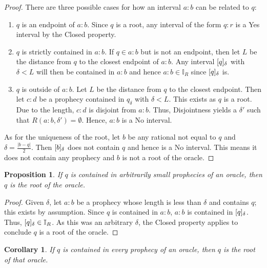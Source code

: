 \documentclass[12pt]{article}
\newtheorem{corollary}{Corollary}[section]
\newtheorem{proposition}{Proposition}[section]
\begin{document}
\begin{proof}
    There are three possible cases for how an interval $a:b$ can be related to $q$:

    \begin{enumerate}
        \item $q$ is an endpoint of $a:b$. Since $q$ is a root, any interval of the form $q:r$ is a Yes interval by the Closed property.
        \item $q$ is strictly contained in $a:b$. If $q \in a:b$ but is not an endpoint, then let $L$ be the distance from $q$ to the closest endpoint of $a:b$. Any interval $[q]_{\delta}$ with $\delta < L $ will then be contained in $a:b$ and hence $a:b \in \mathbb{I}_R$ since $[q]_{\delta}$ is. 
        \item $q$ is outside of $a:b$.  Let $L$ be the distance from $q$ to the closest endpoint. Then let $c:d$ be a prophecy contained in $q_{\delta}$ with $\delta < L$. This exists as $q$ is a root. Due to the length, $c:d$ is disjoint from $a:b$. Thus, Disjointness yields a $\delta'$ such that $R(a:b, \delta')= \emptyset$. Hence, $a:b$ is a No interval. 
    \end{enumerate}
    
    As for the uniqueness of the root, let $b$ be any rational not equal to $q$ and $\delta = \frac{|b-q|}{2}$. Then $[b]_{\delta}$ does not contain $q$ and hence is a No interval. This means it does not contain any prophecy and $b$ is not a root of the oracle. 
\end{proof}


\begin{proposition}\label{os:rootsmallpro}
    If $q$ is contained in arbitrarily small prophecies of an oracle, then $q$ is the root of the oracle. 
\end{proposition}

\begin{proof}
    Given $\delta$, let $a:b$ be a prophecy whose length is less than $\delta$ and contains $q$; this exists by assumption. Since $q$ is contained in $a:b$, $a:b$ is contained in $[q]_{\delta}$. Thus, $[q]_{\delta} \in \mathbb{I}_R$. As this was an arbitrary $\delta$, the Closed property applies to conclude  $q$ is a root of the oracle. 
\end{proof}

\begin{corollary}\label{os:root}
    If $q$ is contained in every prophecy of an oracle, then $q$ is the root of that oracle. 
\end{corollary}
\end{document}
